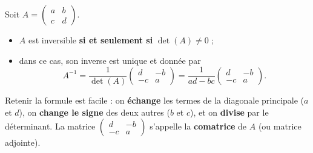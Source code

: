 \documentclass[11pt]{article}
\begin{document}
\begin{propriete}
Soit $A = \begin{pmatrix} a & b \\ c & d \end{pmatrix}$.
\begin{itemize}
\item $A$ est inversible \textbf{si et seulement si} $\det(A) \neq 0$ ;
\item dans ce cas, son inverse est unique et donnée par
\[ A^{-1} = \frac{1}{\det(A)} \begin{pmatrix} d & -b \\ -c & a \end{pmatrix} = \frac{1}{ad-bc}\begin{pmatrix} d & -b \\ -c & a \end{pmatrix}. \]
\end{itemize}
\end{propriete}

Retenir la formule est facile : on \textbf{échange} les termes de la diagonale principale ($a$ et $d$), on \textbf{change le signe} des deux autres ($b$ et $c$), et on \textbf{divise} par le déterminant. La matrice $\begin{pmatrix} d & -b \\ -c & a \end{pmatrix}$ s'appelle la \textbf{comatrice} de $A$ (ou matrice adjointe).
\end{document}
